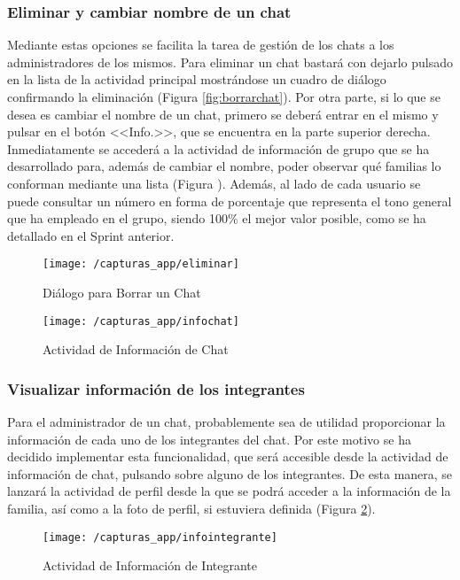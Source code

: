 \clearpage

\subsubsection{Eliminar y cambiar nombre de un chat}
Mediante estas opciones se facilita la tarea de gestión de los chats a los administradores de los mismos. Para eliminar un chat bastará con dejarlo pulsado en la lista de la actividad principal mostrándose un cuadro de diálogo confirmando la eliminación (Figura \ref{fig:borrarchat}). Por otra parte, si lo que se desea es cambiar el nombre de un chat, primero se deberá entrar en el mismo y pulsar en el botón <<Info.>>, que se encuentra en la parte superior derecha. Inmediatamente se accederá a la actividad de información de grupo que se ha desarrollado para, además de cambiar el nombre, poder observar qué familias lo conforman mediante una lista (Figura ). Además, al lado de cada usuario se puede consultar un número en forma de porcentaje que representa el tono general que ha empleado en el grupo, siendo 100\% el mejor valor posible, como se ha detallado en el Sprint anterior.

\begin{figure}[!h]
	\centering
	\begin{minipage}{.5\textwidth}
		\centering
		\texttt{[image: /capturas\_app/eliminar]}
		\caption{Diálogo para Borrar un Chat}
		\label{fig:borrarchat}
	\end{minipage}%
	\begin{minipage}{.5\textwidth}
		\centering
		\texttt{[image: /capturas\_app/infochat]}
		\caption{Actividad de Información de Chat}
		\label{fig:infochat}
	\end{minipage}
\end{figure}

\clearpage

\subsubsection{Visualizar información de los integrantes}
Para el administrador de un chat, probablemente sea de utilidad proporcionar la información de cada uno de los integrantes del chat. Por este motivo se ha decidido implementar esta funcionalidad, que será accesible desde la actividad de información de chat, pulsando sobre alguno de los integrantes. De esta manera, se lanzará la actividad de perfil desde la que se podrá acceder a la información de la familia, así como a la foto de perfil, si estuviera definida (Figura \ref{fig:infointegrante}).

\begin{figure}[!h]
	\begin{center}
		\texttt{[image: /capturas\_app/infointegrante]}
		\caption{Actividad de Información de Integrante}
		\label{fig:infointegrante}
	\end{center}
\end{figure}








